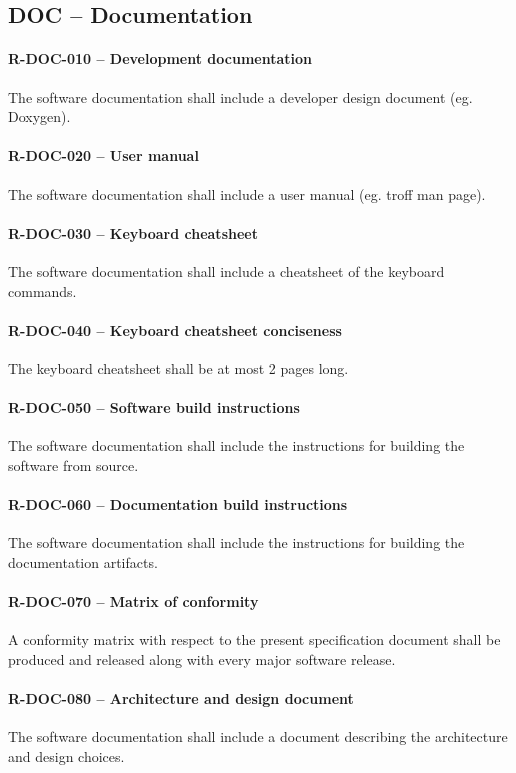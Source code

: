\subsection{DOC -- Documentation}
\paragraph{R-DOC-010 -- Development documentation}
The software documentation shall include a developer design document (eg.
Doxygen).

\paragraph{R-DOC-020 -- User manual}
The software documentation shall include a user manual (eg. troff man page).

\paragraph{R-DOC-030 -- Keyboard cheatsheet}
The software documentation shall include a cheatsheet of the keyboard commands.

\paragraph{R-DOC-040 -- Keyboard cheatsheet conciseness}
The keyboard cheatsheet shall be at most 2 pages long.

\paragraph{R-DOC-050 -- Software build instructions}
The software documentation shall include the instructions for building
the software from source.

\paragraph{R-DOC-060 -- Documentation build instructions}
The software documentation shall include the instructions for building
the documentation artifacts.

\paragraph{R-DOC-070 -- Matrix of conformity}
A conformity matrix with respect to the present specification document shall
be produced and released along with every major software release.

\paragraph{R-DOC-080 -- Architecture and design document}
The software documentation shall include a document describing the architecture
and design choices.

